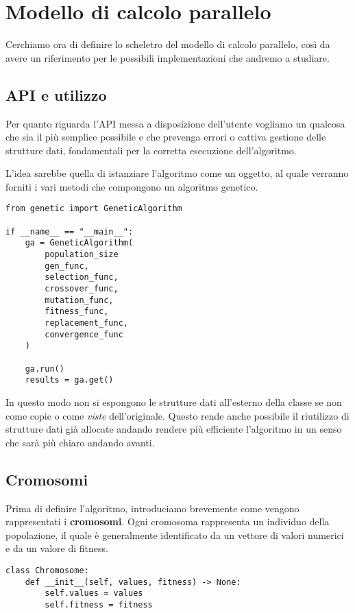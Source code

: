 \section{Modello di calcolo parallelo}

Cerchiamo ora di definire lo scheletro del modello di calcolo parallelo, così
da avere un riferimento per le possibili implementazioni che andremo a studiare.

\subsection{API e utilizzo}

Per quanto riguarda l'API messa a disposizione dell'utente vogliamo un qualcosa
che sia il più semplice possibile e che prevenga errori o cattiva gestione
delle strutture dati, fondamentali per la corretta esecuzione dell'algoritmo.

L'idea sarebbe quella di istanziare l'algoritmo come un oggetto, al quale
verranno forniti i vari metodi che compongono un algoritmo genetico.

\begin{verbatim}
from genetic import GeneticAlgorithm

if __name__ == "__main__":
	ga = GeneticAlgorithm(
		population_size
		gen_func,
		selection_func,
		crossover_func,
		mutation_func,
		fitness_func,
		replacement_func,
		convergence_func
	)

	ga.run()
	results = ga.get()
\end{verbatim}

In questo modo non si espongono le strutture dati all'esterno della classe se
non come copie o come \emph{viste} dell'originale. Questo rende anche possibile
il riutilizzo di strutture dati già allocate andando rendere più efficiente
l'algoritmo in un senso che sarà più chiaro andando avanti.

\subsection{Cromosomi}

Prima di definire l'algoritmo, introduciamo brevemente come vengono
rappresentati i \textbf{cromosomi}. Ogni cromosoma rappresenta un individuo
della popolazione, il quale è generalmente identificato da un vettore di valori
numerici e da un valore di fitness.

\begin{verbatim}
class Chromosome:
	def __init__(self, values, fitness) -> None:
		self.values = values
		self.fitness = fitness
\end{verbatim}

